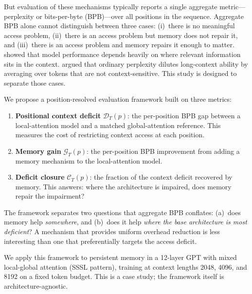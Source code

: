 \documentclass[11pt]{article}
\newcommand{\deficit}{\mathcal{D}}
\newcommand{\gain}{\mathcal{G}}
\newcommand{\closure}{\mathcal{C}}
\begin{document}
But evaluation of these mechanisms typically reports a single aggregate
metric---perplexity or bits-per-byte (BPB)---over all positions in the
sequence. Aggregate BPB alone cannot distinguish between three cases:
(i)~there is no meaningful access problem,
(ii)~there is an access problem but memory does not repair it, and
(iii)~there is an access problem and memory repairs it enough to matter.
\citet{liu2023lost} showed that model performance depends heavily on
where relevant information sits in the context.
\citet{fang2025longppl} argued that ordinary perplexity dilutes
long-context ability by averaging over tokens that are not
context-sensitive. This study is designed to separate those cases.

We propose a position-resolved evaluation framework built on three
metrics:

\begin{enumerate}
\item \textbf{Positional context deficit} $\deficit_T(p)$: the
  per-position BPB gap between a local-attention model and a matched
  global-attention reference. This measures the cost of restricting
  context access at each position.

\item \textbf{Memory gain} $\gain_T(p)$: the per-position BPB
  improvement from adding a memory mechanism to the local-attention
  model.

\item \textbf{Deficit closure} $\closure_T(p)$: the fraction of the
  context deficit recovered by memory. This answers: where the
  architecture is impaired, does memory repair the impairment?
\end{enumerate}

The framework separates two questions that aggregate BPB conflates:
(a)~does memory help \emph{somewhere}, and (b)~does it help
\emph{where the base architecture is most deficient}? A mechanism
that provides uniform overhead reduction is less interesting than one
that preferentially targets the access deficit.

We apply this framework to persistent memory
\citep{sukhbaatar2019persistent} in a 12-layer GPT with mixed
local-global attention (SSSL pattern), training at context lengths
2048, 4096, and 8192 on a fixed token budget. This is a case study;
the framework itself is architecture-agnostic.
\end{document}
